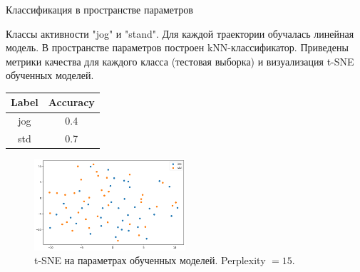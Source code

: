 \documentclass[10pt]{beamer}
\theoremstyle{definition}
\begin{document}
	\begin{frame}{Классификация в пространстве параметров}
		
		Классы активности "jog" и "stand". Для каждой траектории обучалась линейная модель. В пространстве параметров построен kNN-классификатор. Приведены метрики качества для каждого класса (тестовая выборка) и визуализация t-SNE обученных моделей.
		
		\begin{table}[]
			\begin{tabular}{|c|c|}
				\hline
				\textbf{Label} & \textbf{Accuracy} \\ \hline
				jog            & 0.4               \\ \hline
				std            & 0.7               \\ \hline
			\end{tabular}

		\end{table}
		
		 \begin{figure}
		 	\centering
		 	\includegraphics[width=0.5\textwidth]{img/tsne.png}
		 	\caption{t-SNE на параметрах обученных моделей. Perplexity $= 15$.}
		 \end{figure}
		
	\end{frame}
	
\end{document}
